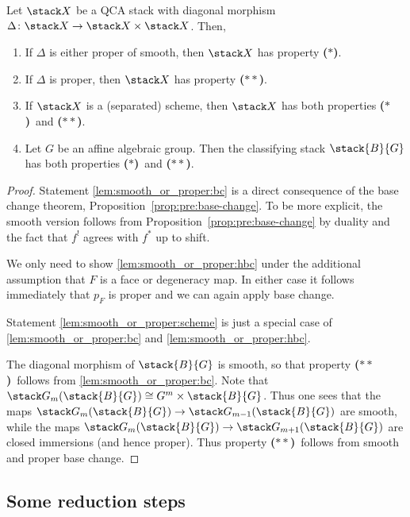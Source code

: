 \documentclass{ck-article}
\newcommand\bc{\textbf{($\mathbf{*}$)}}
\newcommand\hbc{\textbf{($\mathbf{**}$)}}
\newcommand\cs{\stack{B}}
\begin{document}
\begin{Lem}\label{lem:smooth_or_proper}
    Let $\stack X$ be a QCA stack with diagonal morphism $\Delta\colon \stack X \to \stack X \times \stack X$. Then,
    \begin{enumerate}
        \item\label{lem:smooth_or_proper:bc} If $\Delta$ is either proper of smooth, then $\stack X$ has property \bc.
        \item\label{lem:smooth_or_proper:hbc} If $\Delta$ is proper, then $\stack X$ has property \hbc.
        \item\label{lem:smooth_or_proper:scheme} If $\stack X$ is a (separated) scheme, then $\stack X$ has both properties \bc\ and \hbc.
        \item\label{lem:smooth_or_proper:bg} Let $G$ be an affine algebraic group. Then the classifying stack $\cs{G}$ has both properties \bc\ and \hbc.
    \end{enumerate}
\end{Lem}

\begin{proof}
    Statement \ref{lem:smooth_or_proper:bc} is a direct consequence of the base change theorem, Proposition~\ref{prop:pre:base-change}.
    To be more explicit, the smooth version follows from Proposition~\ref{prop:pre:base-change} by duality and the fact that $f^!$ agrees with $f^*$ up to shift.

    We only need to show \ref{lem:smooth_or_proper:hbc} under the additional assumption that $F$ is a face or degeneracy map.
    In either case it follows immediately that $p_{F}$ is proper and we can again apply base change.

    Statement \ref{lem:smooth_or_proper:scheme} is just a special case of \ref{lem:smooth_or_proper:bc} and \ref{lem:smooth_or_proper:hbc}.
    
    The diagonal morphism of $\cs{G}$ is smooth, so that property \hbc\ follows from \ref{lem:smooth_or_proper:bc}.
    Note that $\stack G_m(\cs{G}) \cong G^m \times \cs{G}$.
    Thus one sees that the maps $\stack G_m(\cs{G}) \to \stack G_{m-1}(\cs{G})$ are smooth, while the maps $\stack G_m(\cs{G}) \to \stack G_{m+1}(\cs{G})$ are closed immersions (and hence proper).
    Thus property \hbc\ follows from smooth and proper base change.
\end{proof}

\subsection{Some reduction steps}
\end{document}
